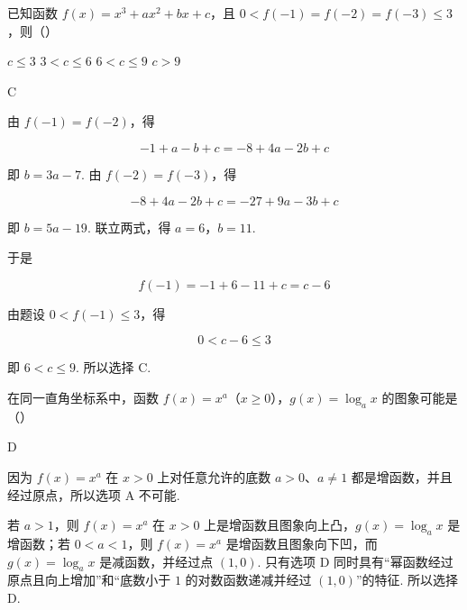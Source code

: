 \begin{problem}
已知函数 \( f(x) = x^{3} + ax^{2} + bx + c \)，且 \( 0 < f(-1) = f(-2) = f(-3) \leqslant 3 \)，则（\quad）

\choices
    {\(c \leqslant 3\)}
    {\(3 < c \leqslant 6\)}
    {\(6 < c \leqslant 9\)}
    {\(c > 9\)}
\end{problem}

\begin{answer}
C
\end{answer}

\begin{solution}
由 \(f(-1)=f(-2)\)，得

\[
-1+a-b+c=-8+4a-2b+c
\]

即 \(b=3a-7\). 由 \(f(-2)=f(-3)\)，得

\[
-8+4a-2b+c=-27+9a-3b+c
\]

即 \(b=5a-19\). 联立两式，得 \(a=6\)，\(b=11\).

于是

\[
f(-1)=-1+6-11+c=c-6
\]

由题设 \(0<f(-1)\leqslant3\)，得

\[
0<c-6\leqslant3
\]

即 \(6<c\leqslant9\). 所以选择 C.
\end{solution}

\begin{problem}
在同一直角坐标系中，函数 \(f(x) = x^a\)（\(x \geqslant 0\)），\( g(x) = \log_a x \) 的图象可能是（\quad）

    {}
    {}
    {}
\end{problem}

\begin{answer}
D
\end{answer}

\begin{solution}
因为 \(f(x)=x^{a}\) 在 \(x>0\) 上对任意允许的底数 \(a>0\)、\(a\ne1\) 都是增函数，并且经过原点，所以选项 A 不可能.

若 \(a>1\)，则 \(f(x)=x^{a}\) 在 \(x>0\) 上是增函数且图象向上凸，\(g(x)=\log_{a}x\) 是增函数；若 \(0<a<1\)，则 \(f(x)=x^{a}\) 是增函数且图象向下凹，而 \(g(x)=\log_{a}x\) 是减函数，并经过点 \((1,0)\). 只有选项 D 同时具有“幂函数经过原点且向上增加”和“底数小于 \(1\) 的对数函数递减并经过 \((1,0)\)”的特征. 所以选择 D.
\end{solution}

